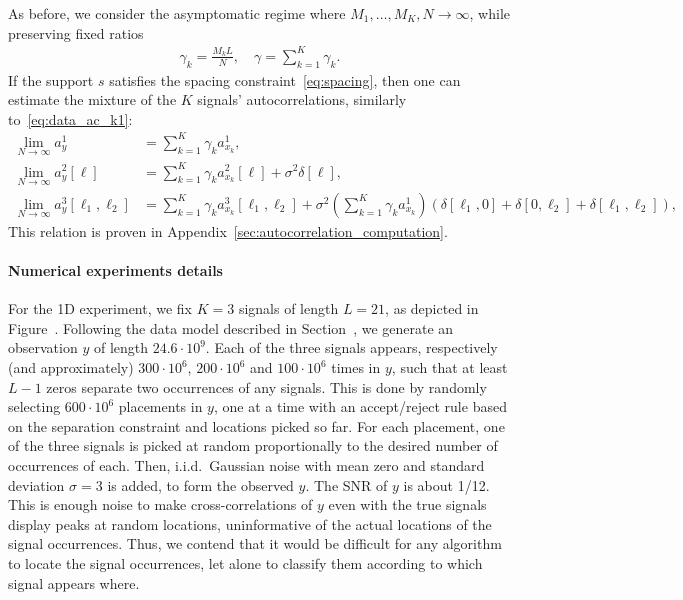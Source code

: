 \documentclass[english,11pt]{article}
\newcommand{\TODO}[1]{{\color{red}{[#1]}}}
\numberwithin{equation}{section}
\theoremstyle{plain}
\theoremstyle{definition}
\theoremstyle{remark}
\theoremstyle{plain}
\theoremstyle{remark}
\theoremstyle{plain}
\theoremstyle{plain}
\begin{document}
As before, we consider  the asymptomatic regime where $M_1,\ldots,M_K,N\to\infty$, while preserving fixed ratios
\begin{align}
	\gamma_k = \frac{M_k L}{N}, \quad \gamma = \sum_{k=1}^K\gamma_k.
\end{align}
If the support $s$ satisfies the spacing constraint~\eqref{eq:spacing}, then one can estimate the mixture of the $K$ signals'  autocorrelations, similarly to~\eqref{eq:data_ac_k1}: 
\begin{align}
\lim_{N\to\infty} a_y^1 & = \sum_{k=1}^K\gamma_k a_{x_k}^1, \nonumber\\
\lim_{N\to\infty} a_y^2[\ell] & = \sum_{k=1}^K\gamma_k a_{x_k}^2[\ell] +\sigma^2\delta[\ell],  \label{eq:data_ac}\\
\lim_{N\to\infty} a_y^3[\ell_1,\ell_2] & = \sum_{k=1}^K\gamma_k a_{x_k}^3[\ell_1,\ell_2] + \sigma^2\left(\sum_{k=1}^K\gamma_k a_{x_k}^1\right)(\delta[\ell_1,0]+\delta[0,\ell_2]+\delta[\ell_1,\ell_2]), \nonumber
\end{align}
This relation is proven in  Appendix~\ref{sec:autocorrelation_computation}.

\paragraph{Numerical experiments details}

\TODO{We may want to split it into two sections. Here we could give a short description with the LS estimator and the RRR. In the supplementary material we can provide all other details. }

For the 1D experiment, we fix $K = 3$ signals of length $L = 21$, as depicted in Figure~\TODO{ref}. Following the data model described in Section~\TODO{ref}, we generate an observation $y$ of length $24.6 \cdot 10^9$. Each of the three signals appears, respectively (and approximately) $300 \cdot 10^6$, $200 \cdot 10^6$ and $100 \cdot 10^6$ times in $y$, such that at least $L-1$ zeros separate two occurrences of any signals. This is done by randomly selecting $600 \cdot 10^6$ placements in $y$, one at a time with an accept/reject rule based on the separation constraint and locations picked so far. For each placement, one of the three signals is picked at random proportionally to the desired number of occurrences of each. Then, i.i.d.\ Gaussian noise with mean zero and standard deviation $\sigma = 3$ is added, to form the observed $y$. The SNR of $y$
is about 1/12.
This is enough noise to make cross-correlations of $y$ even with the true signals display peaks at random locations, uninformative of the actual locations of the signal occurrences. Thus, we contend that it would be difficult for any algorithm to locate the signal occurrences, let alone to classify them according to which signal appears where.
\end{document}
